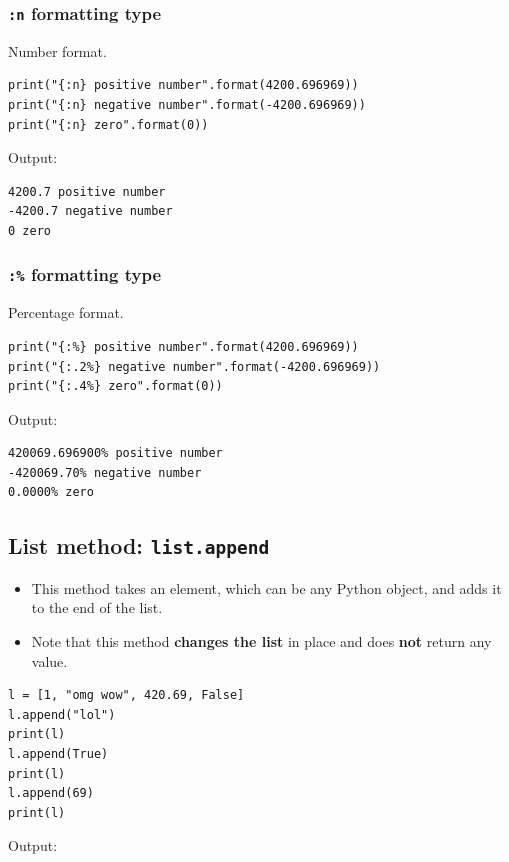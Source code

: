 \documentclass[11pt]{article}
\begin{document}
\subsubsection{\texttt{:n} formatting type}
\label{sec:orgf2947aa}
Number format.

\begin{verbatim}
print("{:n} positive number".format(4200.696969))
print("{:n} negative number".format(-4200.696969))
print("{:n} zero".format(0))
\end{verbatim}

 \noindent Output:

\begin{verbatim}
4200.7 positive number
-4200.7 negative number
0 zero
\end{verbatim}

\subsubsection{\texttt{:\%} formatting type}
\label{sec:org25e450d}
Percentage format.

\begin{verbatim}
print("{:%} positive number".format(4200.696969))
print("{:.2%} negative number".format(-4200.696969))
print("{:.4%} zero".format(0))
\end{verbatim}

 \noindent Output:

\begin{verbatim}
420069.696900% positive number
-420069.70% negative number
0.0000% zero
\end{verbatim}

\subsection{List method: \texttt{list.append}}
\label{sec:org6904daf}
\begin{itemize}
\item This method takes an element, which can be any Python object, and adds it to the end of the list.
\item Note that this method \textbf{changes the list} in place and does \textbf{not} return any value.
\end{itemize}
\begin{verbatim}
l = [1, "omg wow", 420.69, False]
l.append("lol")
print(l)
l.append(True)
print(l)
l.append(69)
print(l)
\end{verbatim}

 \noindent Output:
\end{document}
